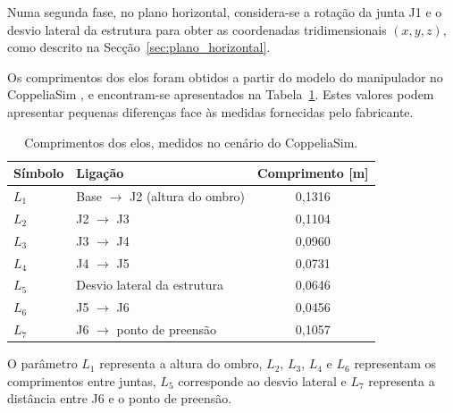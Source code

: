 Numa segunda fase, no plano horizontal, considera-se a rotação da junta J1 e o desvio lateral da estrutura para obter as coordenadas tridimensionais $(x,y,z)$, como descrito na Secção~\ref{sec:plano_horizontal}.

Os comprimentos dos elos foram obtidos a partir do modelo do manipulador no CoppeliaSim \cite{elephant}, e encontram-se apresentados na Tabela~\ref{tab:elos}. Estes valores podem apresentar pequenas diferenças face às medidas fornecidas pelo fabricante.

\begin{table}[htbp]
    \centering
    \caption{Comprimentos dos elos, medidos no cenário do CoppeliaSim.}
    \label{tab:elos}
    \begin{tabular}{llc}
        \hline
        Símbolo & Ligação & Comprimento [m] \\
        \hline
        $L_1$ & Base $\rightarrow$ J2 (altura do ombro) & 0,1316 \\
        $L_2$ & J2 $\rightarrow$ J3 & 0,1104 \\
        $L_3$ & J3 $\rightarrow$ J4 & 0,0960 \\
        $L_4$ & J4 $\rightarrow$ J5 & 0,0731 \\
        $L_5$ & Desvio lateral da estrutura & 0,0646 \\
        $L_6$ & J5 $\rightarrow$ J6 & 0,0456 \\
        $L_7$ & J6 $\rightarrow$ ponto de preensão & 0,1057 \\
        \hline
    \end{tabular}
\end{table}

O parâmetro $L_1$ representa a altura do ombro, $L_2$, $L_3$, $L_4$ e $L_6$ representam os comprimentos entre juntas, $L_5$ corresponde ao desvio lateral e $L_7$ representa a distância entre J6 e o ponto de preensão.




